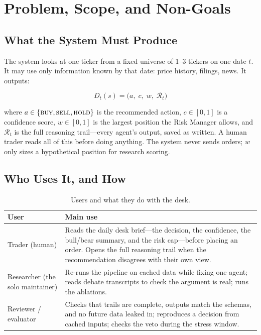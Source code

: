 \documentclass[conference]{IEEEtran}
\begin{document}
\section{Problem, Scope, and Non-Goals}
\label{sec:problem}

\subsection{What the System Must Produce}

The system looks at one ticker from a fixed universe of 1--3 tickers on one date $t$. It may use only information known by that date: price history, filings, news. It outputs:

\begin{equation}
D_t(s) = \big(a,\; c,\; w,\; \mathcal{R}_t\big)
\label{eq:decision}
\end{equation}

where $a \in \{\textsc{buy}, \textsc{sell}, \textsc{hold}\}$ is the recommended action, $c \in [0,1]$ is a confidence score, $w \in [0,1]$ is the largest position the Risk Manager allows, and $\mathcal{R}_t$ is the full reasoning trail---every agent's output, saved as written. A human trader reads all of this before doing anything. The system never sends orders; $w$ only sizes a hypothetical position for research scoring.

\subsection{Who Uses It, and How}

\begin{table}[!t]
\centering
\caption{Users and what they do with the desk.}
\label{tab:users}
\small
\begin{tabularx}{\columnwidth}{L{1.5cm} X}
\toprule
\textbf{User} & \textbf{Main use} \\
\midrule
Trader (human) & Reads the daily desk brief---the decision, the confidence, the bull/bear summary, and the risk cap---before placing an order. Opens the full reasoning trail when the recommendation disagrees with their own view. \\
\addlinespace[2pt]
Researcher (the solo maintainer) & Re-runs the pipeline on cached data while fixing one agent; reads debate transcripts to check the argument is real; runs the ablations. \\
\addlinespace[2pt]
Reviewer / evaluator & Checks that trails are complete, outputs match the schemas, and no future data leaked in; reproduces a decision from cached inputs; checks the veto during the stress window. \\
\bottomrule
\end{tabularx}
\end{table}
\end{document}
